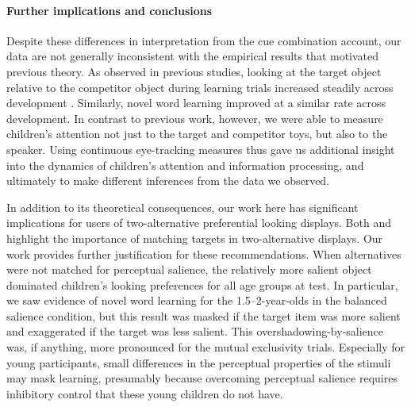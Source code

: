 \documentclass[man,floatsintext]{apa6}
\begin{document}
\paragraph{Further implications and conclusions}

Despite these differences in interpretation from the cue combination account, our data are not generally inconsistent with the empirical results that motivated previous theory. As observed in previous studies, looking at the target object relative to the competitor object during learning trials increased steadily across development \cite{Moore1999,Hollich2000}. Similarly, novel word learning improved at a similar rate across development. In contrast to previous work, however, we were able to measure children's attention not just to the target and competitor toys, but also to the speaker. Using continuous eye-tracking measures thus gave us additional insight into the dynamics of children's attention and information processing, and ultimately to make different inferences from the data we observed.

In addition to its theoretical consequences, our work here has significant implications for users of two-alternative preferential looking displays. Both  and  highlight the importance of matching targets in two-alternative displays. Our work provides further justification for these recommendations. When alternatives were not matched for perceptual salience, the relatively more salient object dominated children's looking preferences for all age groups at test. In particular, we saw evidence of novel word learning for the 1.5--2-year-olds in the balanced salience condition, but this result was masked if the target item was more salient and exaggerated if the target was less salient. This overshadowing-by-salience was, if anything, more pronounced for the mutual exclusivity trials. Especially for young participants, small differences in the perceptual properties of the stimuli may mask learning, presumably because overcoming perceptual salience requires inhibitory control that these young children do not have. 
\end{document}
